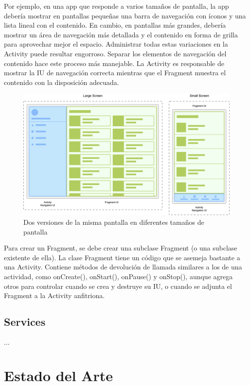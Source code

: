 Por ejemplo, en una app que responde a varios tamaños de pantalla, la app debería mostrar en pantallas pequeñas una barra de navegación con íconos y una lista lineal con el contenido. En cambio, en pantallas más grandes, debería mostrar un área de navegación más detallada y el contenido en forma de grilla para aprovechar mejor el espacio.
Administrar todas estas variaciones en la Activity puede resultar engorroso. Separar los elementos de navegación del contenido hace este proceso más manejable. La Activity es responsable de mostrar la IU de navegación correcta mientras que el Fragment muestra el contenido con la disposición adecuada.

\begin{figure}[H]
  \centering
    \includegraphics[scale=0.4]{04-framework/fragment-screen-sizes.png} 
   \caption{Dos versiones de la misma pantalla en diferentes tamaños de pantalla}
   \label{fig:umlFrameworkCore}
\end{figure}


Para crear un Fragment, se debe crear una subclase Fragment (o una subclase existente de ella). La clase Fragment tiene un código que se asemeja bastante a una Activity. Contiene métodos de devolución de llamada similares a los de una actividad, como onCreate(), onStart(), onPause() y onStop(), aunque agrega otros para controlar cuando se crea y destruye su IU, o cuando se adjunta el Fragment a la Activity anfitriona.
\cite{androidDocs}


\subsection{Services}
...


\section{Estado del Arte}
